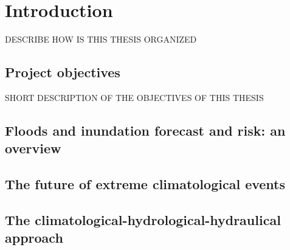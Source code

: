 \chapter{Introduction}
DESCRIBE HOW IS THIS THESIS ORGANIZED

\section{Project objectives}
SHORT DESCRIPTION OF THE OBJECTIVES OF THIS THESIS

\section{Floods and inundation forecast and risk: an overview}

\section{The future of extreme climatological events}

\section{The climatological-hydrological-hydraulical approach}
